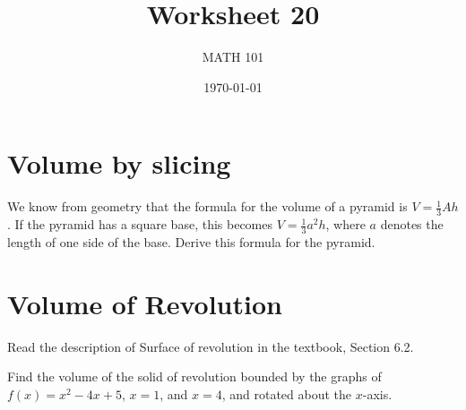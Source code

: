 \documentclass[12pt]{amsart}
\title{ Worksheet 20}
\author{MATH 101}
\date{\today}
\begin{document}
\maketitle

\section*{Volume by slicing}

\begin{problem}
We know from geometry that the formula for the volume of a pyramid is $V=\frac{1}{3}Ah$. If the pyramid has a square base, this becomes $V=\frac{1}{3}a^2h$, where $a$ denotes the length of one side of the base.
Derive this formula for the pyramid.
\end{problem}
\newpage



\section*{Volume of Revolution}
Read the description of Surface of revolution in the textbook, Section 6.2.

\begin{problem}
Find the volume of the solid of revolution bounded by the graphs of $f(x)=x^2-4x+5$, $x=1$, and $x=4$, and rotated about the $x$-axis.
\end{problem}
\end{document}
